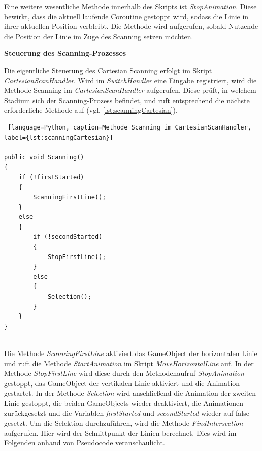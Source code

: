 Eine weitere wesentliche Methode innerhalb des Skripts ist \textit{StopAnimation}. Diese bewirkt, dass die aktuell laufende Coroutine gestoppt wird, sodass die Linie in ihrer aktuellen Position verbleibt. Die Methode wird aufgerufen, sobald Nutzende die Position der Linie im Zuge des Scanning setzen möchten.

\textbf{Steuerung des Scanning-Prozesses}

Die eigentliche Steuerung des Cartesian Scanning erfolgt im Skript \textit{CartesianScanHandler}. Wird im \textit{SwitchHandler} eine Eingabe registriert, wird die Methode Scanning im \textit{CartesianScanHandler} aufgerufen. Diese prüft, in welchem Stadium sich der Scanning-Prozess befindet, und ruft entsprechend die nächste erforderliche Methode auf (vgl. \autoref{lst:scanningCartesian}). 

\begin{lstlisting} [language=Python, caption=Methode Scanning im CartesianScanHandler, label={lst:scanningCartesian}]

public void Scanning()
{
    if (!firstStarted)
    {
        ScanningFirstLine();
    }
    else
    {
        if (!secondStarted)
        {
            StopFirstLine();
        }
        else
        {
            Selection();
        }
    }
}
    
\end{lstlisting}

Die Methode \textit{ScanningFirstLine} aktiviert das GameObject der horizontalen Linie und ruft die Methode \textit{StartAnimation} im Skript \textit{MoveHorizontalLine} auf. In der Methode \textit{StopFirstLine} wird diese durch den Methodenaufruf \textit{StopAnimation} gestoppt, das GameObject der vertikalen Linie aktiviert und die Animation gestartet. In der Methode \textit{Selection} wird anschließend die Animation der zweiten Linie gestoppt, die beiden GameObjects wieder deaktiviert, die Animationen zurückgesetzt und die Variablen \textit{firstStarted} und \textit{secondStarted} wieder auf false gesetzt. Um die Selektion durchzuführen, wird die Methode \textit{FindIntersection} aufgerufen. Hier wird der Schnittpunkt der Linien berechnet. Dies wird im Folgenden anhand von Pseudocode veranschaulicht. 

